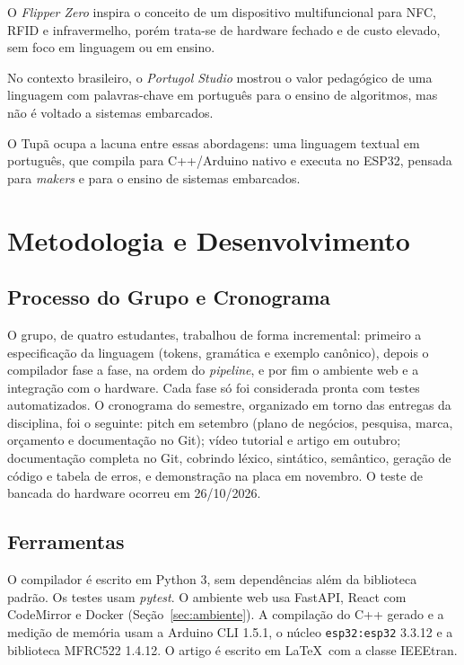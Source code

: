 \documentclass[conference]{IEEEtran}
\begin{document}
O \textit{Flipper Zero} \cite{flipper} inspira o conceito de um dispositivo
multifuncional para NFC, RFID e infravermelho, porém trata-se de hardware
fechado e de custo elevado, sem foco em linguagem ou em ensino.

No contexto brasileiro, o \textit{Portugol Studio} \cite{portugol} mostrou o
valor pedagógico de uma linguagem com palavras-chave em português para o
ensino de algoritmos, mas não é voltado a sistemas embarcados.

O Tupã ocupa a lacuna entre essas abordagens: uma linguagem textual em
português, que compila para C++/Arduino nativo e executa no ESP32, pensada
para \textit{makers} e para o ensino de sistemas embarcados.

\section{Metodologia e Desenvolvimento}\label{sec:metodologia}
\subsection{Processo do Grupo e Cronograma}
O grupo, de quatro estudantes, trabalhou de forma incremental: primeiro a
especificação da linguagem (tokens, gramática e exemplo canônico), depois o
compilador fase a fase, na ordem do \textit{pipeline}, e por fim o ambiente
web e a integração com o hardware. Cada fase só foi considerada pronta com
testes automatizados. O cronograma do semestre, organizado em torno das
entregas da disciplina, foi o seguinte: pitch em setembro (plano de
negócios, pesquisa, marca, orçamento e documentação no Git); vídeo tutorial
e artigo em outubro; documentação completa no Git, cobrindo léxico, sintático,
semântico, geração de código e tabela de erros, e demonstração na placa em
novembro. O teste de bancada do hardware ocorreu em 26/10/2026.

\subsection{Ferramentas}
O compilador é escrito em Python 3, sem dependências além da biblioteca padrão.
Os testes usam \textit{pytest}. O ambiente web usa FastAPI, React com
CodeMirror e Docker (Seção~\ref{sec:ambiente}). A compilação do C++ gerado e a
medição de memória usam a Arduino CLI 1.5.1, o núcleo \texttt{esp32:esp32}
3.3.12 e a biblioteca MFRC522 1.4.12. O artigo é escrito em \LaTeX\ com a
classe IEEEtran.
\end{document}
